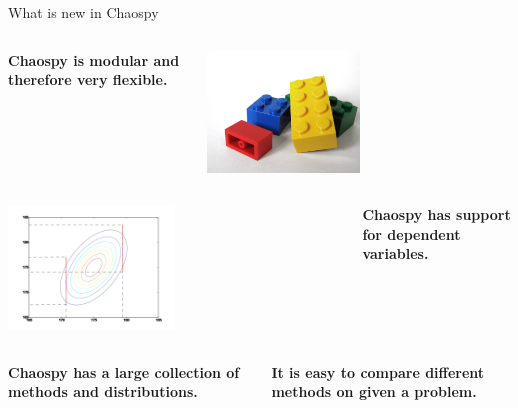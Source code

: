 \documentclass[presentation]{beamer}
\begin{document}
\begin{frame}{What is new in Chaospy}

\vspace{-7mm}
\begin{columns}

     \begin{center}
      \textbf<1>{Chaospy is modular and therefore very flexible.}
     \end{center}
     \begin{center}
            \includegraphics[width=0.5\textwidth]{lego.jpg}
     \end{center}

 \end{columns}

\pause
\vspace{7mm}
\begin{columns}
     \begin{center}
            \includegraphics[width=0.5\textwidth]{dependent.png}
     \end{center}
     \begin{center}
      \textbf<2>{Chaospy has support for dependent variables.}
     \end{center}
 \end{columns}

\pause
\vspace{7mm}
 \begin{columns}
      \begin{center}
             \textbf<3>{Chaospy has a large collection of methods and distributions.}
      \end{center}
      \begin{center}
      \pause \textbf<4>{It is easy to compare different methods on given a problem.}
      \end{center}
  \end{columns}

\end{frame}
\end{document}
